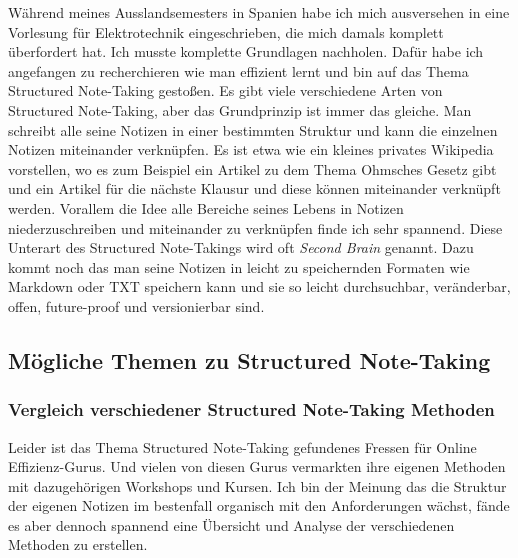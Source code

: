 \documentclass{article}
\begin{document}
Während meines Ausslandsemesters in Spanien habe ich mich ausversehen in eine Vorlesung für Elektrotechnik eingeschrieben, die mich damals komplett überfordert hat.
\linebreak
\linebreak
Ich musste komplette Grundlagen nachholen. Dafür habe ich angefangen zu recherchieren wie man effizient lernt und bin auf das Thema Structured Note-Taking gestoßen.
\linebreak
\linebreak
Es gibt viele verschiedene Arten von Structured Note-Taking, aber das Grundprinzip ist immer das gleiche. Man schreibt alle seine Notizen in einer bestimmten Struktur und kann die einzelnen Notizen miteinander verknüpfen.
\linebreak
Es ist etwa wie ein kleines privates Wikipedia vorstellen, wo es zum Beispiel ein Artikel zu dem Thema Ohmsches Gesetz gibt und ein Artikel für die nächste Klausur und diese können miteinander verknüpft werden.
\linebreak
\linebreak
Vorallem die Idee alle Bereiche seines Lebens in Notizen niederzuschreiben und miteinander zu verknüpfen finde ich sehr spannend. Diese Unterart des Structured Note-Takings wird oft \textit{Second Brain} genannt.
\linebreak
Dazu kommt noch das man seine Notizen in leicht zu speichernden Formaten wie Markdown oder TXT speichern kann und sie so leicht durchsuchbar, veränderbar, offen, future-proof und versionierbar sind.
\pagebreak

\subsection{Mögliche Themen zu Structured Note-Taking}

\subsubsection{Vergleich verschiedener Structured Note-Taking Methoden}
Leider ist das Thema Structured Note-Taking gefundenes Fressen für Online Effizienz-Gurus. Und vielen von diesen Gurus vermarkten ihre eigenen Methoden mit dazugehörigen Workshops und Kursen.
\linebreak
Ich bin der Meinung das die Struktur der eigenen Notizen im bestenfall organisch mit den Anforderungen wächst, fände es aber dennoch spannend eine Übersicht und Analyse der verschiedenen Methoden zu erstellen.
\end{document}
